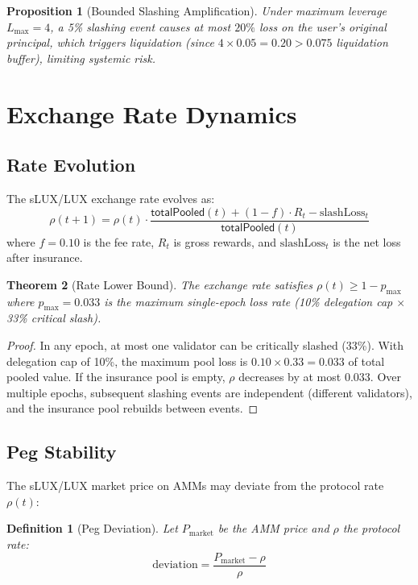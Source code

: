 \documentclass[11pt,a4paper]{article}
\newtheorem{theorem}{Theorem}
\newtheorem{proposition}[theorem]{Proposition}
\newtheorem{definition}{Definition}
\begin{document}
\begin{proposition}[Bounded Slashing Amplification]
Under maximum leverage $L_{\max} = 4$, a 5\% slashing event causes at most $20\%$ loss on the user's original principal, which triggers liquidation (since $4 \times 0.05 = 0.20 > 0.075$ liquidation buffer), limiting systemic risk.
\end{proposition}

\section{Exchange Rate Dynamics}\label{sec:dynamics}

\subsection{Rate Evolution}

The sLUX/LUX exchange rate evolves as:
\begin{equation}
    \rho(t+1) = \rho(t) \cdot \frac{\mathsf{totalPooled}(t) + (1-f) \cdot R_t - \text{slashLoss}_t}{\mathsf{totalPooled}(t)}
\end{equation}
where $f = 0.10$ is the fee rate, $R_t$ is gross rewards, and $\text{slashLoss}_t$ is the net loss after insurance.

\begin{theorem}[Rate Lower Bound]
The exchange rate satisfies $\rho(t) \geq 1 - p_{\text{max}}$ where $p_{\text{max}} = 0.033$ is the maximum single-epoch loss rate (10\% delegation cap $\times$ 33\% critical slash).
\end{theorem}

\begin{proof}
In any epoch, at most one validator can be critically slashed (33\%). With delegation cap of 10\%, the maximum pool loss is $0.10 \times 0.33 = 0.033$ of total pooled value. If the insurance pool is empty, $\rho$ decreases by at most $0.033$. Over multiple epochs, subsequent slashing events are independent (different validators), and the insurance pool rebuilds between events.
\end{proof}

\subsection{Peg Stability}

The sLUX/LUX market price on AMMs may deviate from the protocol rate $\rho(t)$:

\begin{definition}[Peg Deviation]
Let $P_{\text{market}}$ be the AMM price and $\rho$ the protocol rate:
\begin{equation}
    \text{deviation} = \frac{P_{\text{market}} - \rho}{\rho}
\end{equation}
\end{definition}
\end{document}
